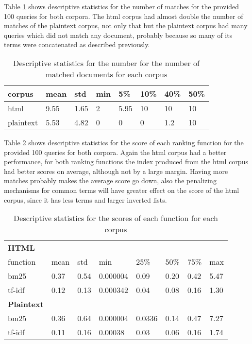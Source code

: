 \documentclass[sigconf,authorversion,nonacm]{acmart}
\begin{document}
Table \ref{tab:query:match} shows descriptive statistics for the number of matches for the provided 100 queries for both corpora. The html corpus had almost double the number of matches of the plaintext corpus, not only that but the plaintext corpus had many queries which did not match any document, probably because so many of its terms were concatenated as described previously.



\begin{table}[h]
  \caption{Descriptive statistics for the number for the number of matched documents for each corpus}
  \label{tab:query:match}
  \begin{tabular}{llllllll}

    corpus    & mean & std  & min & 5\%  & 10\% & 40\% & 50\% \\
    \toprule
    html      & 9.55 & 1.65 & 2   & 5.95 & 10   & 10   & 10   \\
    plaintext & 5.53 & 4.82 & 0   & 0    & 0    & 1.2  & 10   \\
    \bottomrule
  \end{tabular}
\end{table}

Table \ref{tab:query:score} shows descriptive statistics for the score of each ranking function for the provided 100 queries for both corpora. Again the html corpus had a better performance, for both ranking functions the index produced from the html corpus had better scores on average, although not by a large margin. Having more matches probably makes the average score go down, also the penalizing mechanisms for common terms will have greater effect on the score of the html corpus, since it has less terms and larger inverted lists.

\begin{table}[H]
  \caption{Descriptive statistics for the scores of each function for each corpus}
  \label{tab:query:score}
  \begin{tabular}{llllllll}
    \textbf{HTML}                                                   \\
    function & mean & std  & min      & 25\%   & 50\% & 75\% & max  \\
    \toprule
    bm25     & 0.37 & 0.54 & 0.000004 & 0.09   & 0.20 & 0.42 & 5.47 \\
    tf-idf   & 0.12 & 0.13 & 0.000342 & 0.04   & 0.08 & 0.16 & 1.30 \\
    \toprule
    \textbf{Plaintext}                                              \\
    \toprule

    bm25     & 0.36 & 0.64 & 0.000004 & 0.0336 & 0.14 & 0.47 & 7.27 \\
    tf-idf   & 0.11 & 0.16 & 0.00038  & 0.03   & 0.06 & 0.16 & 1.74 \\
    \bottomrule
  \end{tabular}
\end{table}
\end{document}
